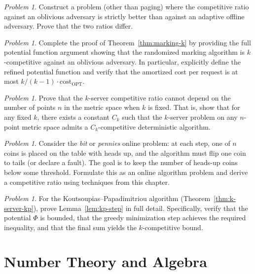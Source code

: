 \documentclass[twoside,12pt]{book}
\theoremstyle{plain}
\theoremstyle{definition}
\theoremstyle{remark}
\newtheorem{problem}[theorem]{Problem}
\begin{document}
\begin{problem}\label{prob:oblivious-vs-adaptive}
Construct a problem (other than paging) where the competitive ratio
against an oblivious adversary is strictly better than against an
adaptive offline adversary.  Prove that the two ratios differ.
\end{problem}

\begin{problem}\label{prob:marking-analysis}
Complete the proof of Theorem~\ref{thm:marking-k} by providing the full
potential function argument showing that the randomized marking algorithm
is $k$-competitive against an oblivious adversary.  In particular,
explicitly define the refined potential function and verify that the
amortized cost per request is at most $k/(k-1) \cdot
\mathrm{cost}_{\mathrm{OPT}}$.
\end{problem}

\begin{problem}\label{prob:k-server-metric}
Prove that the $k$-server competitive ratio cannot depend on the number
of points $n$ in the metric space when $k$ is fixed.  That is, show
that for any fixed $k$, there exists a constant $C_k$ such that the
$k$-server problem on any $n$-point metric space admits a $C_k$-competitive
deterministic algorithm.
\end{problem}

\begin{problem}\label{prob:bit-packing}
Consider the \emph{bit} or \emph{pennies} online problem: at each step,
one of $n$ coins is placed on the table with heads up, and the
algorithm must flip one coin to tails (or declare a fault).  The goal is
to keep the number of heads-up coins below some threshold.  Formulate
this as an online algorithm problem and derive a competitive ratio using
techniques from this chapter.
\end{problem}

\begin{problem}\label{prob:kp-potential}
For the Koutsoupias--Papadimitriou algorithm
(Theorem~\ref{thm:k-server-kp}), prove Lemma~\ref{lem:kp-step} in full
detail.  Specifically, verify that the potential $\Phi$ is bounded, that
the greedy minimization step achieves the required inequality, and that
the final sum yields the $k$-competitive bound.
\end{problem}


\chapter{Number Theory and Algebra}
\label{ch:number-theory}
\end{document}
